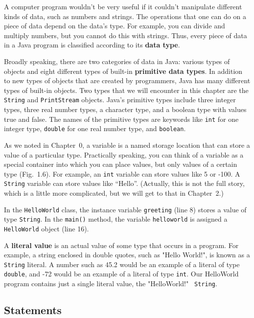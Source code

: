 \noindent A computer program wouldn't be very useful if it couldn't
manipulate different kinds of data, such as numbers and strings.  The
operations that one can do on a piece of data depend on the data's
type. For example, you can divide and multiply numbers, but you cannot
do this with strings.  Thus, every piece of data in a Java program is
classified according to its {\bf data type}.

Broadly speaking, there are two categories of data in Java: various
types of objects and eight different types of built-in {\bf primitive
data types}.  In addition to new types of objects that are created by
programmers, Java has many different types of built-in objects. Two
types that we will encounter in this chapter are the {\tt String} and
{\tt PrintStream} objects. Java's primitive types include three
integer types, three real number types, a character type, and a
boolean type with values true and false.  The names of the primitive
types are keywords like {\tt int} for one integer type, {\tt double}
for one real number type, and {\tt boolean}.

As we noted in Chapter~0, a variable is a named storage location that
can store a value of a particular type. Practically speaking, you can
think of a variable as a special container into which you can place
values, but only values of a certain type (Fig.~1.6). For
example, an {\tt int} variable can store values like 5 or -100. A {\tt
String} variable can store values like ``Hello''.  (Actually, this is
not the full story, which is a little more complicated, but we will
get to that in Chapter~2.)

In the {\tt HelloWorld} class, the instance variable {\tt greeting}
(line 8) stores a value of type {\tt String}. In the {\tt main()}
method, the variable {\tt helloworld} is assigned 
a {\tt HelloWorld} object (line 16).

A {\bf literal value} is an actual value of some type that occurs in a
program. For example, a string enclosed in double quotes, such as
"Hello World!", is known as a {\tt String} literal. A number such as
45.2 would be an example of a literal of type {\tt double}, and -72
would be an example of a literal of type {\tt int}.  Our HelloWorld
program contains just a single literal value, the "HelloWorld!" {\tt
String}.

\subsection{Statements}
\label{sec-statements}

